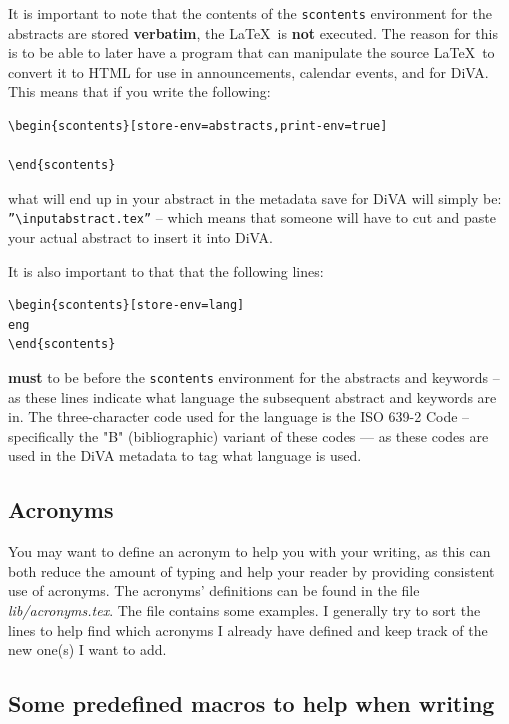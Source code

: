 \documentclass[examplethesis.tex]{subfiles}
\begin{document}
It is important to note that the contents of the \texttt{scontents} environment for the abstracts are stored \textbf{verbatim}, \ie the \LaTeX\  is \textbf{not} executed. The reason for this is to be able to later have a program that can manipulate the source \LaTeX\  to convert it to HTML for use in announcements, calendar events, and for DiVA. This means that if you write the following:
\begin{lstlisting}[style=latexExampleForAuthors]
\begin{scontents}[store-env=abstracts,print-env=true]

\end{scontents}
\end{lstlisting}
\noindent what will end up in your abstract in the metadata save for DiVA will simply be: \texttt{''\textbackslash input{abstract.tex}''} -- which means that someone will have to cut and paste your actual abstract to insert it into DiVA.

It is also important to that that the following lines:
\begin{lstlisting}[style=latexExampleForAuthors]
\begin{scontents}[store-env=lang]
eng
\end{scontents}
\end{lstlisting}
\noindent \textbf{must} to be before the \texttt{scontents} environment for the abstracts and keywords -- as these lines indicate what language the subsequent abstract and keywords are in. The three-character code used for the language is the ISO 639-2 Code – specifically the "B" (bibliographic) variant of these codes --- as these codes are used in the DiVA metadata to tag what language is used.

\subsection{Acronyms}
\label{sec:addingAcronyms}
You may want to define an acronym to help you with your writing, as this can both reduce the amount of typing and help your reader by providing consistent use of acronyms. The acronyms' definitions can be found in the file \textit{lib/acronyms.tex}. The file contains some examples. I generally try to sort the lines to help find which acronyms I already have defined and keep track of the new one(s) I want to add.

\subsection{Some predefined macros to help when writing}
\label{sec:predefine}
\end{document}
